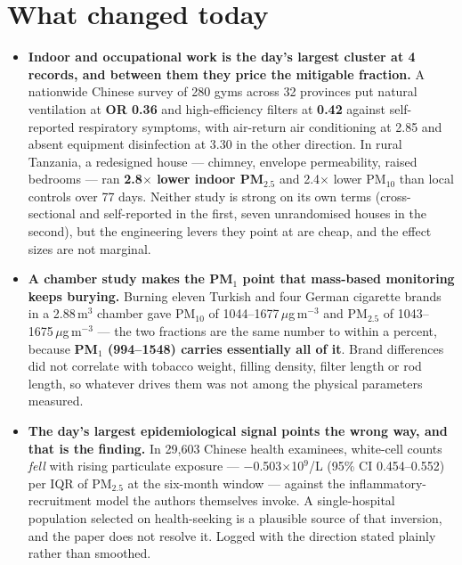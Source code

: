 \documentclass[10pt]{article}
\begin{document}
\section*{\sffamily\bfseries\color{Deep}What changed today}
\vspace{-1.5mm}{\color{Amber}\rule{\linewidth}{1.1pt}}\vspace{2.5mm}

\footnotesize
\begin{itemize}
\item \textbf{Indoor and occupational work is the day's largest cluster at 4 records, and
between them they price the mitigable fraction.} A nationwide Chinese survey of 280 gyms
across 32 provinces put natural ventilation at \textbf{OR 0.36} and high-efficiency
filters at \textbf{0.42} against self-reported respiratory symptoms, with air-return air
conditioning at 2.85 and absent equipment disinfection at 3.30 in the other direction. In
rural Tanzania, a redesigned house --- chimney, envelope permeability, raised bedrooms ---
ran \textbf{2.8$\times$ lower indoor PM$_{2.5}$} and 2.4$\times$ lower PM$_{10}$ than local
controls over 77 days. Neither study is strong on its own terms (cross-sectional and
self-reported in the first, seven unrandomised houses in the second), but the engineering
levers they point at are cheap, and the effect sizes are not marginal.

\item \textbf{A chamber study makes the PM$_1$ point that mass-based monitoring keeps
burying.} Burning eleven Turkish and four German cigarette brands in a 2.88\,m$^3$ chamber
gave PM$_{10}$ of 1044--1677\,$\mu$g\,m$^{-3}$ and PM$_{2.5}$ of
1043--1675\,$\mu$g\,m$^{-3}$ --- the two fractions are the same number to within a
percent, because \textbf{PM$_1$ (994--1548) carries essentially all of it}. Brand
differences did not correlate with tobacco weight, filling density, filter length or rod
length, so whatever drives them was not among the physical parameters measured.

\item \textbf{The day's largest epidemiological signal points the wrong way, and that is
the finding.} In 29{,}603 Chinese health examinees, white-cell counts \emph{fell} with
rising particulate exposure --- $-$0.503$\times$10$^9$/L (95\% CI 0.454--0.552) per IQR of
PM$_{2.5}$ at the six-month window --- against the inflammatory-recruitment model the
authors themselves invoke. A single-hospital population selected on health-seeking is a
plausible source of that inversion, and the paper does not resolve it. Logged with the
direction stated plainly rather than smoothed.


\end{itemize}
\end{document}
